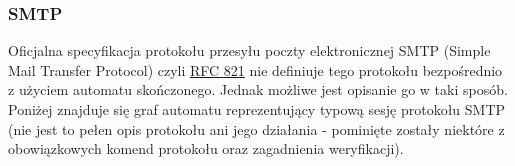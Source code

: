\documentclass{pdfBooklets}
\begin{document}
\subsubsection{SMTP}

Oficjalna specyfikacja protokołu przesyłu poczty elektronicznej SMTP (Simple Mail Transfer Protocol) czyli \href{https://www.rfc-editor.org/info/rfc821}{RFC 821} nie definiuje tego protokołu bezpośrednio z użyciem automatu skończonego. Jednak możliwe jest opisanie go w taki sposób. Poniżej znajduje się graf automatu reprezentujący typową sesję protokołu SMTP (nie jest to pełen opis protokołu ani jego działania - pominięte zostały niektóre z obowiązkowych komend protokołu oraz zagadnienia weryfikacji).

\vspace{0.5cm}
\end{document}
